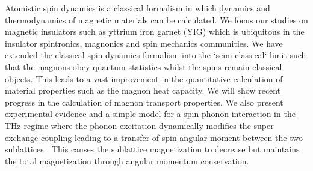 Atomistic spin dynamics is a classical formalism in which dynamics and thermodynamics of magnetic materials can be calculated. We focus our studies on magnetic insulators such as yttrium iron garnet (YIG) which is ubiquitous in the insulator spintronics, magnonics and spin mechanics communities. We have extended the classical spin dynamics formalism into the `semi-classical` limit such that the magnons obey quantum statistics whilst the spins remain classical objects. This leads to a vast improvement in the quantitative calculation of material properties such as the magnon heat capacity. We will show recent progress in the calculation of magnon transport properties. We also present experimental evidence and a simple model for a spin-phonon interaction in the THz regime where the phonon excitation dynamically modifies the super exchange coupling leading to a transfer of spin angular moment between the two sublattices \cite{1710.02700v1}. This causes the sublattice magnetization to decrease but maintains the total magnetization through angular momentum conservation.